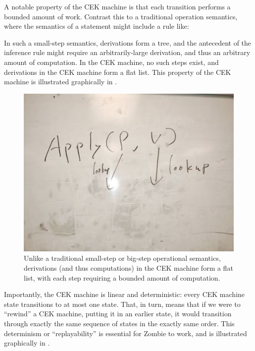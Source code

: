 A notable property of the CEK machine is that each transition performs
a bounded amount of work. Contrast this to a traditional operation
semantics, where the semantics of a \sCase statement might include a
rule like:

\begin{mathpar}
\end{mathpar}

In such a small-step semantics, derivations form a tree,
  and the antecedent of the inference rule might require
  an arbitrarily-large derivation,
  and thus an arbitrary amount of computation.
In the CEK machine, no such steps exist,
  and derivations in the CEK machine form a flat list.
This property of the CEK machine
  is illustrated graphically in .

\begin{figure}
\includegraphics[width=0.5\columnwidth]{img1}
\caption{
  Unlike a traditional small-step or big-step operational semantics,
  derivations (and thus computations) in the CEK machine
  form a flat list, with each step
  requiring a bounded amount of computation.
}
\label{fig:constant}
\end{figure}

Importantly, the CEK machine is linear and deterministic:
  every CEK machine state transitions to at most one state.
That, in turn, means that if we were to ``rewind'' a CEK machine,
  putting it in an earlier state,
  it would transition through exactly the same sequence of states
  in the exactly same order.
This determinism or ``replayability''
  is essential for Zombie to work,
  and is illustrated graphically in .

